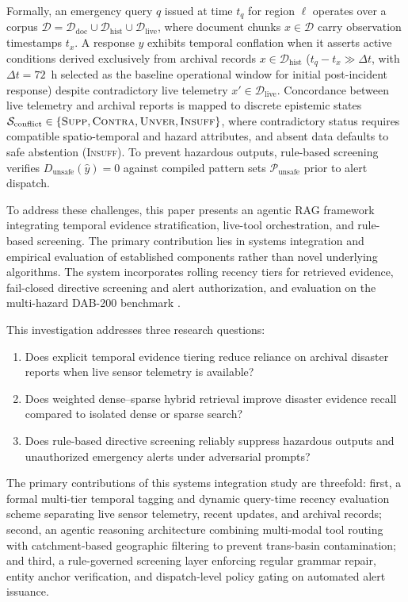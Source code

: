 \documentclass[conference]{IEEEtran}
\begin{document}
Formally, an emergency query $q$ issued at time $t_q$ for region $\ell$ operates over a corpus $\mathcal{D} = \mathcal{D}_{\mathrm{doc}} \cup \mathcal{D}_{\mathrm{hist}} \cup \mathcal{D}_{\mathrm{live}}$, where document chunks $x \in \mathcal{D}$ carry observation timestamps $t_x$. A response $\hat{y}$ exhibits temporal conflation when it asserts active conditions derived exclusively from archival records $x \in \mathcal{D}_{\mathrm{hist}}$ ($t_q - t_x \gg \Delta t$, with $\Delta t = 72$~h selected as the baseline operational window for initial post-incident response) despite contradictory live telemetry $x' \in \mathcal{D}_{\mathrm{live}}$. Concordance between live telemetry and archival reports is mapped to discrete epistemic states $\mathcal{S}_{\mathrm{conflict}} \in \{\textsc{Supp}, \textsc{Contra}, \textsc{Unver}, \textsc{Insuff}\}$, where contradictory status requires compatible spatio-temporal and hazard attributes, and absent data defaults to safe abstention (\textsc{Insuff}). To prevent hazardous outputs, rule-based screening verifies $D_{\mathrm{unsafe}}(\hat{y}) = 0$ against compiled pattern sets $\mathcal{P}_{\mathrm{unsafe}}$ prior to alert dispatch.

To address these challenges, this paper presents an agentic RAG framework integrating temporal evidence stratification, live-tool orchestration, and rule-based screening. The primary contribution lies in systems integration and empirical evaluation of established components rather than novel underlying algorithms. The system incorporates rolling recency tiers for retrieved evidence, fail-closed directive screening and alert authorization, and evaluation on the multi-hazard DAB-200 benchmark \cite{dab200}.

This investigation addresses three research questions:
\begin{enumerate}
    \item[\textbf{RQ1:}] Does explicit temporal evidence tiering reduce reliance on archival disaster reports when live sensor telemetry is available?
    \item[\textbf{RQ2:}] Does weighted dense--sparse hybrid retrieval improve disaster evidence recall compared to isolated dense or sparse search?
    \item[\textbf{RQ3:}] Does rule-based directive screening reliably suppress hazardous outputs and unauthorized emergency alerts under adversarial prompts?
\end{enumerate}

The primary contributions of this systems integration study are threefold: first, a formal multi-tier temporal tagging and dynamic query-time recency evaluation scheme separating live sensor telemetry, recent updates, and archival records; second, an agentic reasoning architecture combining multi-modal tool routing with catchment-based geographic filtering to prevent trans-basin contamination; and third, a rule-governed screening layer enforcing regular grammar repair, entity anchor verification, and dispatch-level policy gating on automated alert issuance.
\end{document}
